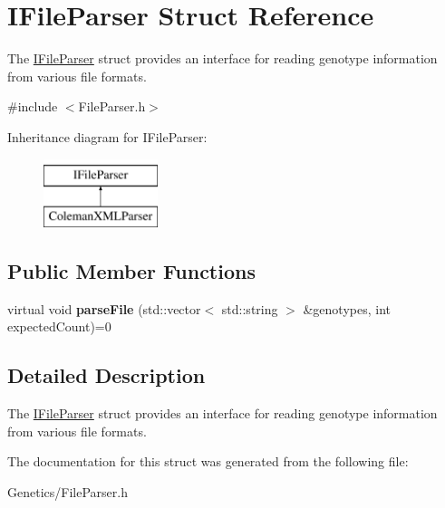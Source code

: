 \hypertarget{struct_i_file_parser}{}\section{I\+File\+Parser Struct Reference}
\label{struct_i_file_parser}


The \hyperlink{struct_i_file_parser}{I\+File\+Parser} struct provides an interface for reading genotype information from various file formats.  




{\ttfamily \#include $<$File\+Parser.\+h$>$}

Inheritance diagram for I\+File\+Parser\+:\begin{figure}[H]
\begin{center}
\leavevmode
\includegraphics[height=2.000000cm]{struct_i_file_parser}
\end{center}
\end{figure}
\subsection*{Public Member Functions}
\begin{DoxyCompactItemize}
\item 
virtual void {\bfseries parse\+File} (std\+::vector$<$ std\+::string $>$ \&genotypes, int expected\+Count)=0\hypertarget{struct_i_file_parser_a3507bb9e7f103b5bbcc64f1077087fc3}{}\label{struct_i_file_parser_a3507bb9e7f103b5bbcc64f1077087fc3}

\end{DoxyCompactItemize}


\subsection{Detailed Description}
The \hyperlink{struct_i_file_parser}{I\+File\+Parser} struct provides an interface for reading genotype information from various file formats. 

The documentation for this struct was generated from the following file\+:\begin{DoxyCompactItemize}
\item 
Genetics/File\+Parser.\+h\end{DoxyCompactItemize}
